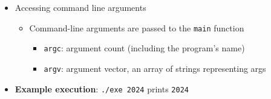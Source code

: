 \documentclass{article}
\begin{document}
\begin{itemize}
	\item Accessing command line arguments \begin{itemize}
		\item Command-line arguments are passed to the \texttt{main} function \begin{itemize}
			\item \texttt{argc}: argument count (including the program's name)
			\item \texttt{argv}: argument vector, an array of strings representing args
		\end{itemize}
	\end{itemize}
	
	\item \textbf{Example execution}: \texttt{./exe 2024} prints \texttt{2024}
\end{itemize}
\end{document}
